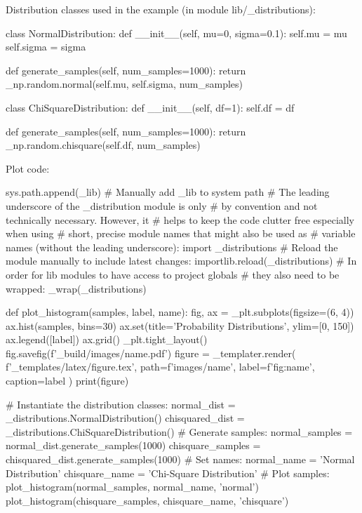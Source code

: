 Distribution classes used in the example (in module lib/\_distributions):
\begin{python}
class NormalDistribution:
    def __init__(self, mu=0, sigma=0.1):
        self.mu = mu
        self.sigma = sigma
   
    def generate_samples(self, num_samples=1000):
        return _np.random.normal(self.mu, self.sigma, num_samples)

class ChiSquareDistribution:
    def __init__(self, df=1):
        self.df = df

    def generate_samples(self, num_samples=1000):
        return _np.random.chisquare(self.df, num_samples)

\end{python}
Plot code:
\begin{python}
sys.path.append(_lib) # Manually add _lib to system path
# The leading underscore of the _distribution module is only 
# by convention and not technically necessary. However, it 
# helps to keep the code clutter free especially when using 
# short, precise module names that might also be used as 
# variable names (without the leading underscore):
import _distributions
# Reload the module manually to include latest changes: 
importlib.reload(_distributions)
# In order for lib modules to have access to project globals 
# they also need to be wrapped:
_wrap(_distributions)

def plot_histogram(samples, label, name):
    fig, ax = _plt.subplots(figsize=(6, 4))
    ax.hist(samples, bins=30)
    ax.set(title='Probability Distributions', ylim=[0, 150])
    ax.legend([label])
    ax.grid()
    _plt.tight_layout()
    fig.savefig(f'{_build}/images/{name}.pdf')
    figure = _templater.render(
        f'{_templates}/latex/figure.tex',
        path=f'images/{name}',
        label=f'fig:{name}',
        caption=label
    )
    print(figure)

# Instantiate the distribution classes:
normal_dist         = _distributions.NormalDistribution()
chisquared_dist     = _distributions.ChiSquareDistribution()
# Generate samples:
normal_samples      = normal_dist.generate_samples(1000)
chisquare_samples   = chisquared_dist.generate_samples(1000)
# Set names:
normal_name         = 'Normal Distribution'
chisquare_name      = 'Chi-Square Distribution'
# Plot samples:
plot_histogram(normal_samples, normal_name, 'normal')
plot_histogram(chisquare_samples, chisquare_name, 'chisquare')

\end{python}
